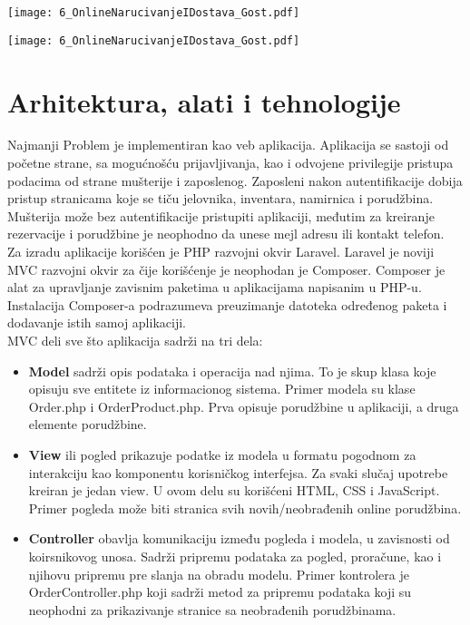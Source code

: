 \documentclass{article}
\begin{document}
\texttt{[image: 6\_OnlineNarucivanjeIDostava\_Gost.pdf]}

\texttt{[image: 6\_OnlineNarucivanjeIDostava\_Gost.pdf]}

\section{Arhitektura, alati i tehnologije}


Najmanji Problem je implementiran kao veb aplikacija. Aplikacija se sastoji od početne strane, sa mogućnošću prijavljivanja, kao i odvojene privilegije pristupa podacima od strane mušterije i zaposlenog. Zaposleni nakon autentifikacije dobija pristup stranicama koje se tiču jelovnika, inventara, namirnica i porudžbina. Mušterija može bez autentifikacije pristupiti aplikaciji, međutim za kreiranje rezervacije i porudžbine je neophodno da unese mejl adresu ili kontakt telefon.\\

Za izradu aplikacije korišćen je PHP razvojni okvir Laravel. Laravel je noviji MVC razvojni okvir za čije korišćenje je neophodan je Composer. Composer je alat za upravljanje zavisnim paketima u aplikacijama napisanim u PHP-u. Instalacija Composer-a podrazumeva preuzimanje datoteka određenog paketa i dodavanje istih samoj aplikaciji.\\

MVC deli sve što aplikacija sadrži na tri dela:
\begin{itemize}
	\item \textbf{Model} sadrži opis podataka i operacija nad njima. To je skup klasa koje opisuju sve entitete iz informacionog sistema. Primer modela su klase Order.php i OrderProduct.php. Prva opisuje porudžbine u aplikaciji, a druga elemente porudžbine.
	\item \textbf{View} ili pogled prikazuje podatke iz modela u formatu pogodnom za interakciju kao komponentu korisničkog interfejsa. Za svaki slučaj upotrebe kreiran je jedan view. U ovom delu su korišćeni HTML, CSS i JavaScript. Primer pogleda može biti stranica svih novih/neobrađenih online porudžbina.
	\item \textbf{Controller} obavlja komunikaciju između pogleda i modela, u zavisnosti od koirsnikovog unosa. Sadrži pripremu podataka za pogled, proračune, kao i njihovu pripremu pre slanja na obradu modelu. Primer kontrolera je OrderController.php koji sadrži metod za pripremu podataka koji su neophodni za prikazivanje stranice sa neobrađenih porudžbinama.
\end{itemize}
\end{document}
